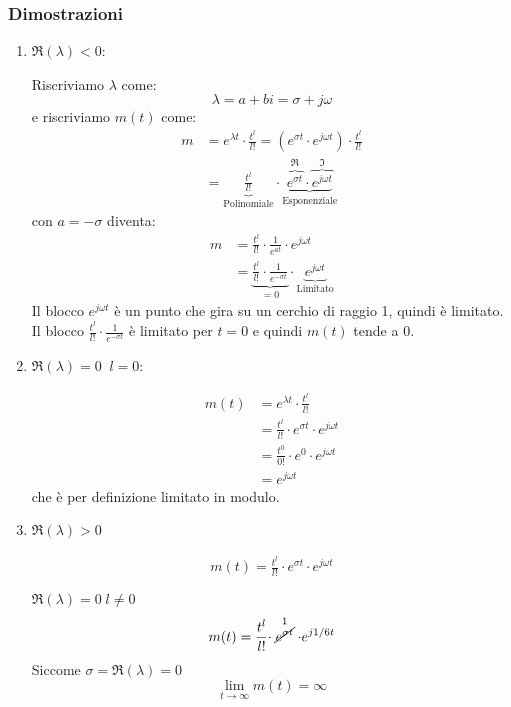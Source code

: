 \documentclass[a4paper]{article}
\begin{document}
\subsubsection{Dimostrazioni}
\begin{enumerate}
  \item \( \Re(\lambda) < 0 \):

    \vspace{1em}
    \noindent
    Riscriviamo \( \lambda \) come:
    \[
    \lambda = a+bi = \sigma +j\omega
    \] 
    e riscriviamo \( m(t) \) come:
    \[
      \begin{aligned}
        m &= e^{\lambda t} \cdot \frac{t^l}{l!} = \left( e^{\sigma t} \cdot 
        e^{j \omega t} \right) \cdot \frac{t^l}{l!}\\
          &= \underbrace{\frac{t^l}{l!}}_{\text{Polinomiale}} \cdot
          \underbrace{\overbrace{e^{\sigma t}}^{\Re} \cdot \overbrace{e^{j \omega t}}^{\Im}}_{\text{Esponenziale}}
      \end{aligned}
    \] 
    con \( a = -\sigma \) diventa:
    \[
    \begin{aligned}
      m &= \frac{t^l}{l!} \cdot \frac{1}{e^{at}} \cdot e^{j \omega t}\\
        &= \underbrace{\frac{t^l}{l!} \cdot \frac{1}{e^{-\sigma t}}}_{=0} 
        \cdot \underbrace{e^{j \omega t}}_{\text{Limitato}}
    \end{aligned}
    \] 
    Il blocco \( e^{j \omega t} \) è un punto che gira su un cerchio di raggio 1, quindi
    è limitato. Il blocco \( \frac{t^l}{l!} \cdot \frac{1}{e^{-\sigma t}} \) è limitato
    per \( t = 0 \) e quindi \( m(t) \) tende a 0.

  \item \( \Re(\lambda) = 0 \;\; l=0 \):

    \vspace{1em}
    \noindent
    \[
      \begin{aligned}
        m(t) &= e^{\lambda t} \cdot \frac{t^l}{l!}\\
             &= \frac{t^l}{l!} \cdot e^{\sigma t} 
             \cdot e^{j \omega t}\\
             &= \frac{t^0}{0!} \cdot e^0 \cdot e^{j \omega t}\\
             &= e^{j \omega t}
      \end{aligned}
    \] 
    che è per definizione limitato in modulo.

  \item \( \Re(\lambda) > 0 \) 

    \vspace{1em}
    \noindent
    \[
    \begin{aligned}
      m(t) = \frac{t^l}{l!} \cdot e^{\sigma t} \cdot e^{j \omega t}
    \end{aligned}
    \] 


    \( \Re(\lambda) = 0 \; l \neq 0\) 
    \vspace{1em}
    \noindent
    \[
      m(t) = \frac{t^l}{l!} \cdot \stackrel{1}{\cancel{e^{\sigma t}}} \cdot e^{j \omega t}
    \] 
    Siccome \( \sigma = \Re(\lambda) = 0 \) 
    \[
    \lim_{t \to \infty} m(t) = \infty
    \] 
\end{enumerate}
\end{document}

